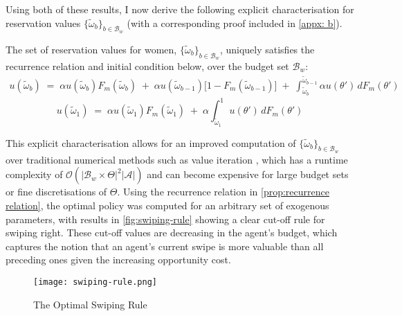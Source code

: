 Using both of these results, I now derive the following explicit characterisation for reservation values $\{\widetilde\omega_b\}_{b\in \mathcal{B}_w}$ (with a corresponding proof included in \autoref{appx: b}). 
\begin{proposition}\label{prop:recurrence relation}
The set of reservation values for women, $\{\widetilde\omega_b\}_{b\in \mathcal{B}_w}$, uniquely satisfies the recurrence relation and initial condition below, over the budget set $\mathcal{B}_w$: 
\begin{equation}\label{eq:recurrence relation}
    \begin{aligned}
        u(\widetilde \omega_b) \;=\; \alpha u(\widetilde \omega_b) F_m(\widetilde \omega_b) \;+\; \alpha u(\widetilde \omega_{b-1}) \Big[1- F_m(\widetilde \omega_{b-1})\Big] \;+\; \int^{\widetilde \omega_{b-1}}_{\widetilde \omega_b} \alpha u(\theta')\,dF_m(\theta')
    \end{aligned} 
\end{equation}  
\begin{equation}\label{eq:initial condition}
    u(\widetilde\omega_1) \;=\; \alpha u(\widetilde\omega_1)F_m(\widetilde\omega_1) \;+\; \alpha \int^1_{\widetilde\omega_1}u(\theta')\,dF_m(\theta')
\end{equation}
\end{proposition}  

This explicit characterisation allows for an improved computation of $\{\widetilde\omega_b\}_{b\in \mathcal{B}_w}$ over traditional numerical methods such as value iteration \citep{bellman2015applied}, which has a runtime complexity of $\mathcal{O}(|\mathcal{B}_w\times\Theta|^2|\mathcal{A}|)$ and can become expensive for large budget sets or fine discretisations of $\Theta$. Using the recurrence relation in \autoref{prop:recurrence relation}, the optimal policy was computed for an arbitrary set of exogenous parameters, with results in \autoref{fig:swiping-rule} showing a clear cut-off rule for swiping right. 
These cut-off values are decreasing in the agent's budget, which captures the notion that an agent's current swipe is more valuable than all preceding ones given the increasing opportunity cost.

\begin{figure}[ht]
    \centering
    \caption{The Optimal Swiping Rule}
    \texttt{[image: swiping-rule.png]}
    \label{fig:swiping-rule} 
\end{figure} 